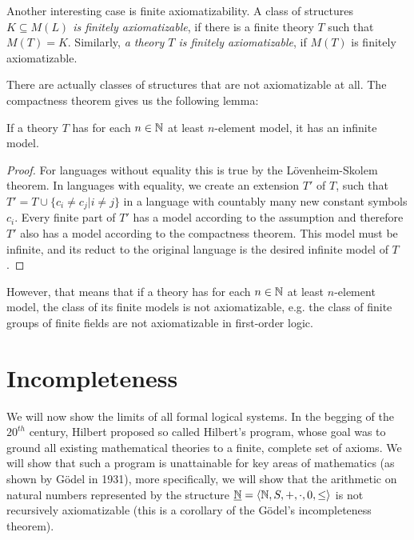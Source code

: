 Another interesting case is finite axiomatizability. A class of structures \emph{$K \subseteq M(L)$ is finitely axiomatizable}, if there is a finite theory $T$ such that $M(T) = K$. Similarly, \emph{a theory $T$ is finitely axiomatizable}, if $M(T)$ is finitely axiomatizable. 

There are actually classes of structures that are not axiomatizable at all. The compactness theorem gives us the following lemma:

\begin{lemma}
If a theory $T$ has for each $n \in \mathbb{N}$ at least $n$-element model, it has an infinite model.
\end{lemma}
\begin{proof}
For languages without equality this is true by the Lövenheim-Skolem theorem. In languages with equality, we create an extension $T'$ of $T$, such that $T' = T \cup \{c_i \neq c_j| i \neq j\}$ in a language with countably many new constant symbols $c_i$. Every finite part of $T'$ has a model according to the assumption and therefore $T'$ also has a model according to the compactness theorem. This model must be infinite, and its reduct to the original language is the desired infinite model of $T$.
\end{proof}

However, that means that if a theory has for each $n \in \mathbb{N}$ at least $n$-element model, the class of its finite models is not axiomatizable, e.g. the class of finite groups of finite fields are not axiomatizable in first-order logic.

\section{Incompleteness}

We will now show the limits of all formal logical systems. In the begging of the $20^{th}$ century, Hilbert proposed so called Hilbert's program, whose goal was to ground all existing mathematical theories to a finite, complete set of axioms. We will show that such a program is unattainable for key areas of mathematics (as shown by Gödel in 1931), more specifically, we will show that the arithmetic on natural numbers represented by the structure $\underline{\mathbb{N}} = \langle \mathbb{N}, S, +, \cdot, 0, \leq \rangle$ is not recursively axiomatizable (this is a corollary of the Gödel's incompleteness theorem).

